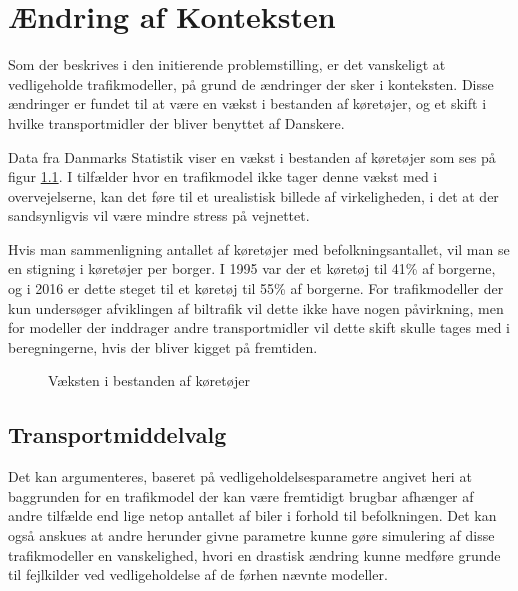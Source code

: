 \chapter{Ændring af Konteksten}
Som der beskrives i den initierende problemstilling, er det vanskeligt at vedligeholde trafikmodeller, på grund de ændringer der sker i konteksten. Disse ændringer er fundet til at være en vækst i bestanden af køretøjer, og et skift i hvilke transportmidler der bliver benyttet af Danskere.

\vspace{5mm}

Data fra Danmarks Statistik viser en vækst i bestanden af køretøjer som ses på figur \ref{plotvaekstbiler}. I tilfælder hvor en trafikmodel ikke tager denne vækst med i overvejelserne, kan det føre til et urealistisk billede af virkeligheden, i det at der sandsynligvis vil være mindre stress på vejnettet.

\vspace{5mm}

Hvis man sammenligning antallet af køretøjer med befolkningsantallet, vil man se en stigning i køretøjer per borger. I 1995 var der et køretøj til 41\% af borgerne, og i 2016 er dette steget til et køretøj til 55\% af borgerne. For trafikmodeller der kun undersøger afviklingen af biltrafik vil dette ikke have nogen påvirkning, men for modeller der inddrager andre transportmidler vil dette skift skulle tages med i beregningerne, hvis der bliver kigget på fremtiden.

\begin{figure}[h!]
    
    \caption{Væksten i bestanden af køretøjer}
    \label{plotvaekstbiler}
\end{figure}


\section{Transportmiddelvalg}
Det kan argumenteres, baseret på vedligeholdelsesparametre angivet heri at baggrunden for en trafikmodel der kan være fremtidigt brugbar afhænger af andre tilfælde end lige netop antallet af biler i forhold til befolkningen. Det kan også anskues at andre herunder givne parametre kunne gøre simulering af disse trafikmodeller en vanskelighed, hvori en drastisk ændring kunne medføre grunde til fejlkilder ved vedligeholdelse af de førhen nævnte modeller.

